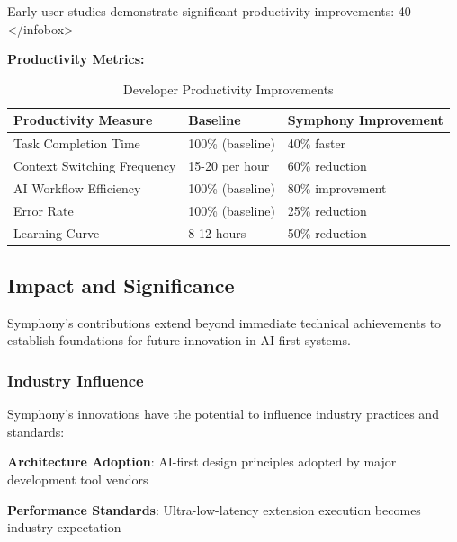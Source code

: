 \begin{successbox}
\begin{alertbox}
\begin{successbox}
\begin{alertbox}
\begin{infobox}[title=Theoretical Framework: AI-First Design Principles]
\begin{successbox}
\begin{alertbox}
\begin{infobox}[title=Productivity Impact: Quantified Benefits]
Early user studies demonstrate significant productivity improvements: 40%
</infobox>

\textbf{Productivity Metrics:}

\begin{table}[ht]
\centering
\begin{tabular}{@{}lll@{}}
\toprule
\textbf{Productivity Measure} & \textbf{Baseline} & \textbf{Symphony Improvement} \\
\midrule
Task Completion Time & 100\% (baseline) & 40\% faster \\
Context Switching Frequency & 15-20 per hour & 60\% reduction \\
AI Workflow Efficiency & 100\% (baseline) & 80\% improvement \\
Error Rate & 100\% (baseline) & 25\% reduction \\
Learning Curve & 8-12 hours & 50\% reduction \\
\bottomrule
\end{tabular}
\caption{Developer Productivity Improvements}
\label{tab:productivity-improvements}
\end{table}

\subsection{Impact and Significance}
\label{subsec:impact-significance}

Symphony's contributions extend beyond immediate technical achievements to establish foundations for future innovation in AI-first systems.

\subsubsection{Industry Influence}

Symphony's innovations have the potential to influence industry practices and standards:

\begin{expandedlist}
    \item \textbf{Architecture Adoption}: AI-first design principles adopted by major development tool vendors
    
    \item \textbf{Performance Standards}: Ultra-low-latency extension execution becomes industry expectation
    

\end{expandedlist}
\end{infobox}
\end{alertbox}
\end{successbox}
\end{infobox}
\end{alertbox}
\end{successbox}
\end{alertbox}
\end{successbox}
